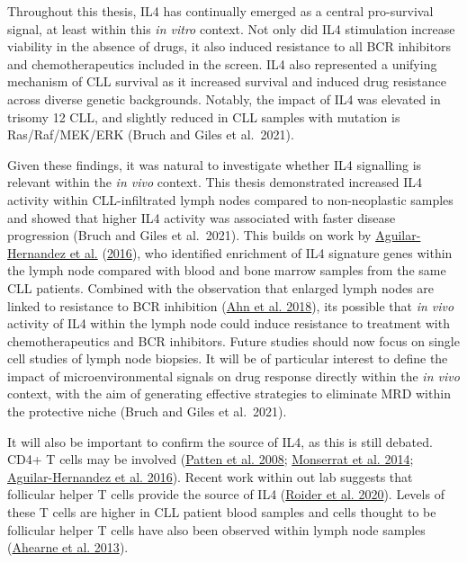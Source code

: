 \documentclass[11pt, a4paper, twosided]{book}
\begin{document}
Throughout this thesis, IL4 has continually emerged as a central pro-survival signal, at least within this \emph{in vitro} context. Not only did IL4 stimulation increase viability in the absence of drugs, it also induced resistance to all BCR inhibitors and chemotherapeutics included in the screen. IL4 also represented a unifying mechanism of CLL survival as it increased survival and induced drug resistance across diverse genetic backgrounds. Notably, the impact of IL4 was elevated in trisomy 12 CLL, and slightly reduced in CLL samples with mutation is Ras/Raf/MEK/ERK (Bruch and Giles et al.~2021).

Given these findings, it was natural to investigate whether IL4 signalling is relevant within the \emph{in vivo} context. This thesis demonstrated increased IL4 activity within CLL-infiltrated lymph nodes compared to non-neoplastic samples and showed that higher IL4 activity was associated with faster disease progression (Bruch and Giles et al.~2021). This builds on work by \protect\hyperlink{ref-AguilarHernandez2016}{Aguilar-Hernandez et al.} (\protect\hyperlink{ref-AguilarHernandez2016}{2016}), who identified enrichment of IL4 signature genes within the lymph node compared with blood and bone marrow samples from the same CLL patients. Combined with the observation that enlarged lymph nodes are linked to resistance to BCR inhibition (\protect\hyperlink{ref-Ahn2018}{Ahn et al. 2018}), its possible that \emph{in vivo} activity of IL4 within the lymph node could induce resistance to treatment with chemotherapeutics and BCR inhibitors. Future studies should now focus on single cell studies of lymph node biopsies. It will be of particular interest to define the impact of microenvironmental signals on drug response directly within the \emph{in vivo} context, with the aim of generating effective strategies to eliminate MRD within the protective niche (Bruch and Giles et al.~2021).

It will also be important to confirm the source of IL4, as this is still debated. CD4+ T cells may be involved (\protect\hyperlink{ref-Patten2008}{Patten et al. 2008}; \protect\hyperlink{ref-Monserrat2014}{Monserrat et al. 2014}; \protect\hyperlink{ref-AguilarHernandez2016}{Aguilar-Hernandez et al. 2016}). Recent work within out lab suggests that follicular helper T cells provide the source of IL4 (\protect\hyperlink{ref-Roider2020}{Roider et al. 2020}). Levels of these T cells are higher in CLL patient blood samples and cells thought to be follicular helper T cells have also been observed within lymph node samples (\protect\hyperlink{ref-Ahearne2013}{Ahearne et al. 2013}).
\end{document}
